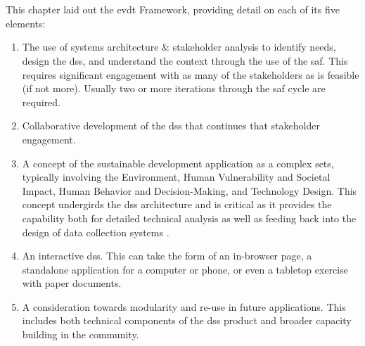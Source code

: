 %
%




\section{} \label{sec:evdt-conclusion}

This chapter laid out the \acf{evdt} Framework, providing detail on each of its five elements:

\begin{enumerate}[label=\emph{\Alph*},itemsep=0pt,parsep=0pt]
	\item{The use of systems architecture \& stakeholder analysis to identify needs, design the \ac{dss}, and understand the context through the use of the \acf{saf}. This requires significant engagement with as many of the stakeholders as is feasible (if not more). Usually two or more iterations through the \ac{saf} cycle are required.}
	\item{Collaborative development of the \ac{dss} that continues that stakeholder engagement.}
	\item{A concept of the sustainable development application as a complex \ac{sets}, typically involving the Environment, Human Vulnerability and Societal Impact, Human Behavior and Decision-Making, and Technology Design. This concept undergirds the \ac{dss} architecture and is critical as it provides the capability both for detailed technical analysis as well as feeding back into the design of data collection systems .}
	\item{An interactive \ac{dss}. This can take the form of an in-browser page, a standalone application for a computer or phone, or even a tabletop exercise with paper documents.}
	\item{A consideration towards modularity and re-use in future applications. This includes both technical components of the \ac{dss} product and broader capacity building in the community.}
\end{enumerate}

